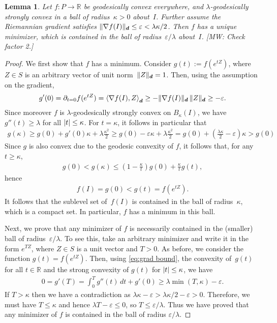 \documentclass{article}
\newtheorem{lemma}[theorem]{Lemma}
\DeclarePairedDelimiter{\abs}{\lvert}{\rvert}
\DeclarePairedDelimiter{\norm}{\lVert}{\rVert}
\newcommand{\R}{{\mathbb{R}}}
\renewcommand{\vec}{\bm}
\newcommand\eps{\varepsilon}
\newcommand{\MW}[1]{{\color{red}[MW: #1]}}
\begin{document}
\begin{lemma}\label{lem:convex-ball}
Let $f\colon P\to \R$ be geodesically convex everywhere, and $\lambda$-geodesically strongly convex in a ball of radius~$\kappa>0$ about~$I$.
Further assume the Riemannian gradient satisfies $\norm{\nabla f(I)}_{\vec d} \leq \eps < \lambda \kappa / 2$.
Then $f$ has a unique minimizer, which is contained in the ball of radius~$\eps/\lambda$ about~$I$.
\MW{Check factor 2.}
\end{lemma}
\begin{proof}
We first show that $f$ has a minimum.
Consider $g(t) := f(e^{t Z})$, where $Z\in S$ is an arbitrary vector of unit norm~$\norm Z_{\vec d} = 1$.
Then, using the assumption on the gradient,
\begin{align}\label{eq:grad bound}
  g'(0)
= \partial_{t=0} f(e^{t Z})
= \braket{\nabla f(I), Z}_{\vec d}
\geq -\norm{\nabla f(I)}_{\vec d} \, \norm Z_{\vec d}
\geq -\eps.
\end{align}
Since moreover $f$ is $\lambda$-geodesically strongly convex on $B_\kappa(I)$, we have $g''(t) \geq \lambda$ for all $\abs t\leq\kappa$.
For $t=\kappa$, it follows in particular that
\begin{align*}
  g(\kappa)
\geq g(0) + g'(0) \kappa + \lambda \frac{\kappa^2}2
\geq g(0) - \eps \kappa + \lambda \frac{\kappa^2}2
= g(0) + \left( \frac{\lambda\kappa}2 - \eps \right) \kappa
> g(0)
\end{align*}
Since $g$ is also convex due to the geodesic convexity of $f$, it follows that, for any~$t \geq \kappa$,
\begin{align*}
  g(0) < g(\kappa) \leq \left( 1-\frac{\kappa}t \right) g(0) + \frac{\kappa}t g(t),
\end{align*}
hence
\begin{align*}
  f(I) = g(0) < g(t) = f(e^{tZ}).
\end{align*}
It follows that the sublevel set of~$f(I)$ is contained in the ball of radius~$\kappa$, which is a compact set.
In particular, $f$ has a minimum in this ball.

Next, we prove that any minimizer of $f$ is necessarily contained in the (smaller) ball of radius~$\eps/\lambda$.
To see this, take an arbitrary minimizer and write it in the form $e^{TZ}$, where $Z\in S$ is a unit vector and $T>0$.
As before, we consider the function $g(t) = f(e^{t Z})$.
Then, using \cref{eq:grad bound}, the convexity of~$g(t)$ for all $t\in\R$ and the strong convexity of $g(t)$ for $\abs t \leq \kappa$, we have
\begin{align*}
  0 = g'(T) = \int_0^T g''(t) \, dt + g'(0) \geq \lambda \min(T, \kappa) - \eps.
\end{align*}
If $T>\kappa$ then we have a contradiction as $\lambda\kappa - \eps > \lambda\kappa/2 - \eps > 0$.
Therefore, we must have $T\leq\kappa$ and hence $\lambda T - \eps \leq 0$, so $T \leq \eps/\lambda$.
Thus we have proved that any minimizer of $f$ is contained in the ball of radius $\eps/\lambda$.


\end{proof}
\end{document}
